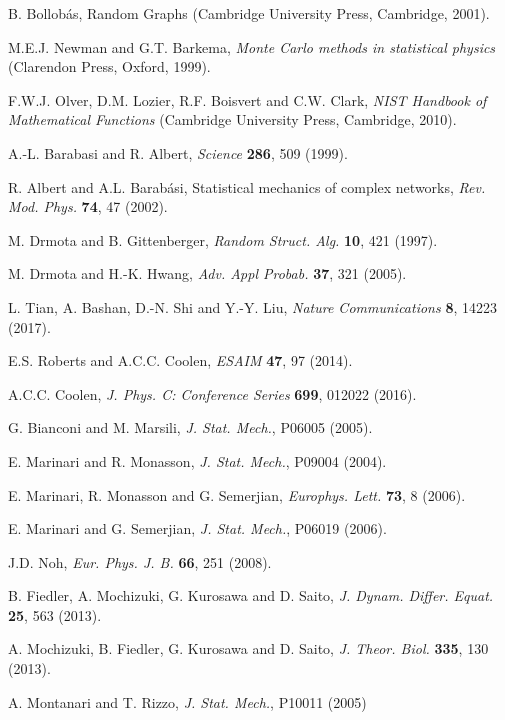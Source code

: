 \documentclass[preprint,pre,superscriptaddress,showpacs]{revtex4}
\begin{document}
\begin{thebibliography}{10}
B. Bollob\'as, 
Random Graphs 
(Cambridge University Press, Cambridge, 2001).


M.E.J. Newman and G.T. Barkema,
{\it Monte Carlo methods in  statistical physics}
(Clarendon Press, Oxford, 1999).


F.W.J. Olver, D.M. Lozier, R.F. Boisvert and C.W. Clark, 
{\it NIST Handbook of Mathematical Functions} 
(Cambridge University Press, Cambridge, 2010).



A.-L. Barabasi and R. Albert, 
{\it Science} {\bf 286},  509  (1999).

R. Albert and A.L. Barab\'asi, 
Statistical mechanics of complex networks,
{\it Rev. Mod. Phys.} {\bf 74}, 47 (2002).

M. Drmota and B. Gittenberger,
{\it Random Struct. Alg.} {\bf 10}, 421 (1997).

M. Drmota and H.-K. Hwang,
{\it Adv. Appl Probab.} {\bf 37}, 321 (2005).


L. Tian, A. Bashan, D.-N. Shi and Y.-Y. Liu,
{\it Nature Communications} {\bf 8}, 14223 (2017).

E.S. Roberts and A.C.C. Coolen, 
{\it ESAIM} {\bf 47}, 97 (2014).

A.C.C. Coolen, 
{\it J. Phys. C: Conference Series} 
{\bf 699}, 012022 (2016).

G. Bianconi and M. Marsili, 
{\it J. Stat. Mech.}, P06005 (2005).

E. Marinari and R. Monasson, 
{\it J. Stat. Mech.}, P09004 (2004).

E. Marinari, R. Monasson and G. Semerjian, 
{\it Europhys. Lett.} {\bf 73}, 8 (2006).

E. Marinari and G. Semerjian, 
{\it J. Stat. Mech.}, P06019 (2006).

J.D. Noh,
{\it Eur. Phys. J. B.} {\bf 66}, 251 (2008).

B. Fiedler, A. Mochizuki, G. Kurosawa and D. Saito,
{\it J. Dynam. Differ. Equat.} {\bf 25}, 563 (2013).

A. Mochizuki, B. Fiedler, G. Kurosawa and D. Saito,
{\it J. Theor. Biol.} {\bf 335}, 130 (2013).

A. Montanari and T. Rizzo,
{\it J. Stat. Mech.}, P10011 (2005)


\end{thebibliography}
\end{document}
